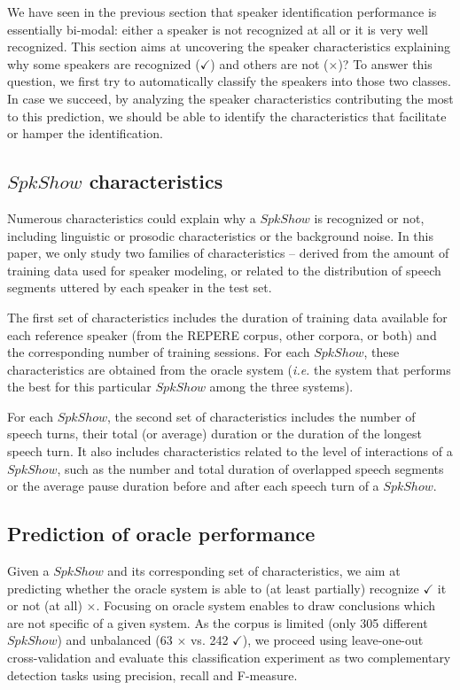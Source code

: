 We have seen in the previous section that speaker identification performance is essentially bi-modal: either a speaker is not recognized at all or it is very well recognized. This section aims at uncovering the speaker characteristics explaining why some speakers are recognized ($\checkmark$) and others are not ($\times$)? To answer this question, we first try to automatically classify the speakers into those two classes. In case we succeed, by analyzing the speaker characteristics contributing the most to this prediction, we should be able to identify the characteristics that facilitate or hamper the identification.

\subsection{$SpkShow$ characteristics}

Numerous characteristics could explain why a $SpkShow$ is recognized or not, including linguistic or prosodic characteristics or the background noise. In this paper, we only study two families of characteristics -- derived from the amount of training data used for speaker modeling, or related to the distribution of speech segments uttered by each speaker in the test set. 

The first set of characteristics includes the duration of training data available for each reference speaker (from the REPERE corpus, other corpora, or both) and the corresponding number of training sessions. For each $SpkShow$, these characteristics are obtained from the oracle system (\emph{i.e.} the system that performs the best for this particular $SpkShow$ among the three systems).

For each $SpkShow$, the second set of characteristics includes the number of speech turns, their total (or average) duration or the duration of the longest speech turn. It also includes characteristics related to the level of interactions of a $SpkShow$, such as the number and total duration of overlapped speech segments or the average pause duration before and after each speech turn of a $SpkShow$.

\subsection{Prediction of oracle performance}

Given a $SpkShow$ and its corresponding set of characteristics, we aim at predicting whether the oracle system is able to (at least partially) recognize $\checkmark$ it or not (at all) $\times$.  Focusing on oracle system enables to draw conclusions which are not specific of a given system.
As the corpus is limited (only 305 different $SpkShow$) and unbalanced (63 $\times$ vs. 242 $\checkmark$), we proceed using leave-one-out cross-validation and evaluate this classification experiment as two complementary detection tasks using precision, recall and F-measure.

